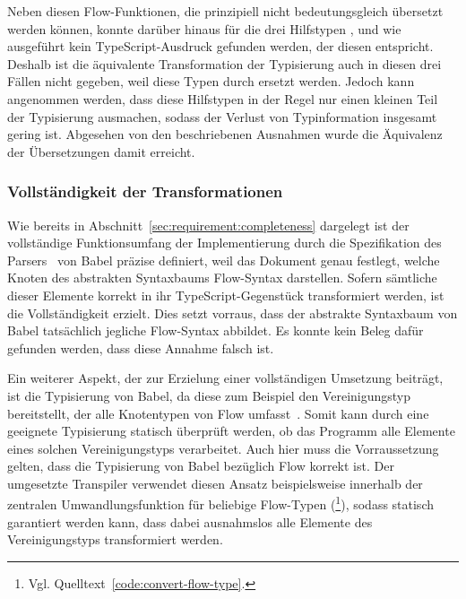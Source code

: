Neben diesen Flow-Funktionen, die prinzipiell nicht bedeutungsgleich übersetzt werden können, konnte darüber hinaus für die drei Hilfstypen ,  und  wie ausgeführt kein TypeScript-Ausdruck gefunden werden, der diesen entspricht. Deshalb ist die äquivalente Transformation der Typisierung auch in diesen drei Fällen nicht gegeben, weil diese Typen durch  ersetzt werden. Jedoch kann angenommen werden, dass diese Hilfstypen in der Regel nur einen kleinen Teil der Typisierung ausmachen, sodass der Verlust von Typinformation insgesamt gering ist. Abgesehen von den beschriebenen Ausnahmen wurde die Äquivalenz der Übersetzungen damit erreicht.

\subsubsection{Vollständigkeit der Transformationen}

Wie bereits in Abschnitt~\ref{sec:requirement:completeness} dargelegt ist der vollständige Funktionsumfang der Implementierung durch die Spezifikation des Parsers~\autocite{BABEL:PARSER_SPEC} von Babel präzise definiert, weil das Dokument genau festlegt, welche Knoten des abstrakten Syntaxbaums Flow-Syntax darstellen. Sofern sämtliche dieser Elemente korrekt in ihr TypeScript-Gegenstück transformiert werden, ist die Vollständigkeit erzielt. Dies setzt vorraus, dass der abstrakte Syntaxbaum von Babel tatsächlich jegliche Flow-Syntax abbildet. Es konnte kein Beleg dafür gefunden werden, dass diese Annahme falsch ist.

Ein weiterer Aspekt, der zur Erzielung einer vollständigen Umsetzung beiträgt, ist die Typisierung von Babel, da diese zum Beispiel den Vereinigungstyp  bereitstellt, der alle Knotentypen von Flow umfasst~\autocite{BABEL:TYPES}. Somit kann durch eine geeignete Typisierung statisch überprüft werden, ob das Programm alle Elemente eines solchen Vereinigungstyps verarbeitet. Auch hier muss die Vorraussetzung gelten, dass die Typisierung von Babel bezüglich Flow korrekt ist.
Der umgesetzte Transpiler verwendet diesen Ansatz beispielsweise innerhalb der zentralen Umwandlungsfunktion für beliebige Flow-Typen (\footnote{Vgl. Quelltext~\ref{code:convert-flow-type}.}), sodass statisch garantiert werden kann, dass dabei ausnahmslos alle Elemente des Vereinigungstyps  transformiert werden.

